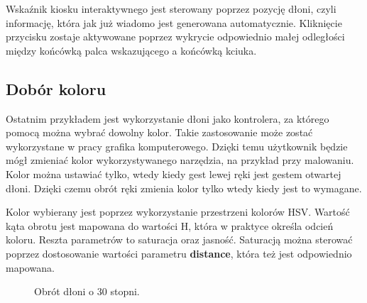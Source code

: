 \quad Wskaźnik kiosku interaktywnego jest sterowany poprzez pozycję dłoni, czyli informację, która jak już wiadomo jest generowana automatycznie. Kliknięcie przycisku zostaje aktywowane poprzez wykrycie odpowiednio małej odległości między końcówką palca wskazującego a końcówką kciuka. 


\subsection{Dobór koloru}
\quad Ostatnim przykładem jest wykorzystanie dłoni jako kontrolera, za którego pomocą można wybrać dowolny kolor. Takie zastosowanie może zostać wykorzystane w pracy grafika komputerowego. Dzięki temu użytkownik będzie mógł zmieniać kolor wykorzystywanego narzędzia, na przykład przy malowaniu. Kolor można ustawiać tylko, wtedy kiedy gest lewej ręki jest gestem otwartej dłoni. Dzięki czemu obrót ręki zmienia kolor tylko wtedy kiedy jest to wymagane. 

\quad Kolor wybierany jest poprzez wykorzystanie przestrzeni kolorów HSV. Wartość kąta obrotu jest mapowana do wartości H, która w praktyce określa odcień koloru. Reszta parametrów to saturacja oraz jasność. Saturacją można sterować poprzez dostosowanie wartości parametru \textbf{distance}, która też jest odpowiednio mapowana. 

\begin{figure}[H]
    \centering
    \hfill
    \caption{Obrót dłoni o 30 stopni.}
\end{figure}

